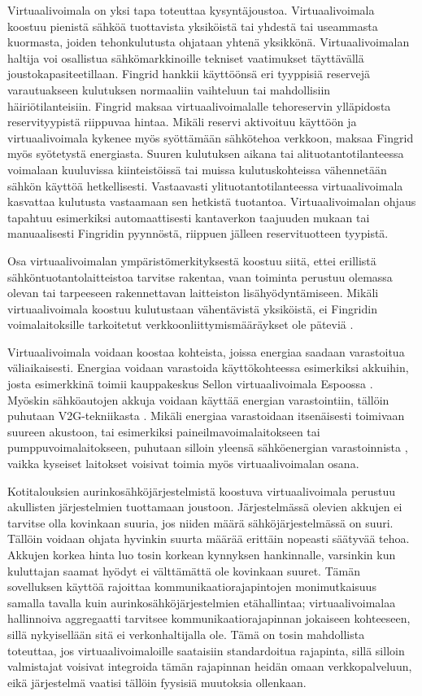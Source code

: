   Virtuaalivoimala on yksi tapa toteuttaa kysyntäjoustoa. Virtuaalivoimala koostuu pienistä sähköä tuottavista yksiköistä tai yhdestä tai useammasta kuormasta, joiden tehonkulutusta ohjataan yhtenä yksikkönä. Virtuaalivoimalan haltija voi osallistua sähkömarkkinoille tekniset vaatimukset täyttävällä joustokapasiteetillaan. Fingrid hankkii käyttöönsä eri tyyppisiä reservejä varautuakseen kulutuksen normaaliin vaihteluun tai mahdollisiin häiriötilanteisiin. Fingrid maksaa virtuaalivoimalalle tehoreservin ylläpidosta reservityypistä riippuvaa hintaa. Mikäli reservi aktivoituu käyttöön ja virtuaalivoimala kykenee myös syöttämään sähkötehoa verkkoon, maksaa Fingrid myös syötetystä energiasta. Suuren kulutuksen aikana tai alituotantotilanteessa voimalaan kuuluvissa kiinteistöissä tai muissa kulutuskohteissa vähennetään sähkön käyttöä hetkellisesti. Vastaavasti ylituotantotilanteessa virtuaalivoimala kasvattaa kulutusta vastaamaan sen hetkistä tuotantoa. Virtuaalivoimalan ohjaus tapahtuu esimerkiksi automaattisesti kantaverkon taajuuden mukaan tai manuaalisesti Fingridin pyynnöstä, riippuen jälleen reservituotteen tyypistä. \parencite{fingrid, reserviLaki}

  Osa virtuaalivoimalan ympäristömerkityksestä koostuu siitä, ettei erillistä sähköntuotantolaitteistoa tarvitse rakentaa, vaan toiminta perustuu olemassa olevan tai tarpeeseen rakennettavan laitteiston lisähyödyntämiseen. Mikäli virtuaalivoimala koostuu kulutustaan vähentävistä yksiköistä, ei Fingridin voimalaitoksille tarkoitetut verkkoonliittymismääräykset ole päteviä \parencite{VJV2018}.

  Virtuaalivoimala voidaan koostaa kohteista, joissa energiaa saadaan varastoitua väliaikaisesti. Energiaa voidaan varastoida käyttökohteessa esimerkiksi akkuihin, josta esimerkkinä toimii kauppakeskus Sellon virtuaalivoimala Espoossa \parencite{sello}. Myöskin sähköautojen akkuja voidaan käyttää energian varastointiin, tällöin puhutaan \gls{V2G}-tekniikasta \parencite{dictOfEnergy}. Mikäli energiaa varastoidaan itsenäisesti toimivaan suureen akustoon, tai esimerkiksi paineilmavoimalaitokseen tai pumppuvoimalaitokseen, puhutaan silloin yleensä sähköenergian varastoinnista \parencite{dictOfEnergy}, vaikka kyseiset laitokset voisivat toimia myös virtuaalivoimalan osana.

  Kotitalouksien aurinkosähköjärjestelmistä koostuva virtuaalivoimala perustuu akullisten järjestelmien tuottamaan joustoon. Järjestelmässä olevien akkujen ei tarvitse olla kovinkaan suuria, jos niiden määrä sähköjärjestelmässä on suuri. Tällöin voidaan ohjata hyvinkin suurta määrää erittäin nopeasti säätyvää tehoa. Akkujen korkea hinta luo tosin korkean kynnyksen hankinnalle, varsinkin kun kuluttajan saamat hyödyt ei välttämättä ole kovinkaan suuret. Tämän sovelluksen käyttöä rajoittaa kommunikaatiorajapintojen monimutkaisuus samalla tavalla kuin aurinkosähköjärjestelmien etähallintaa; virtuaalivoimalaa hallinnoiva aggregaatti tarvitsee kommunikaatiorajapinnan jokaiseen kohteeseen, sillä nykyisellään sitä ei verkonhaltijalla ole. Tämä on tosin mahdollista toteuttaa, jos virtuaalivoimaloille saataisiin standardoitua rajapinta, sillä silloin valmistajat voisivat integroida tämän rajapinnan heidän omaan verkkopalveluun, eikä järjestelmä vaatisi tällöin fyysisiä muutoksia ollenkaan.

